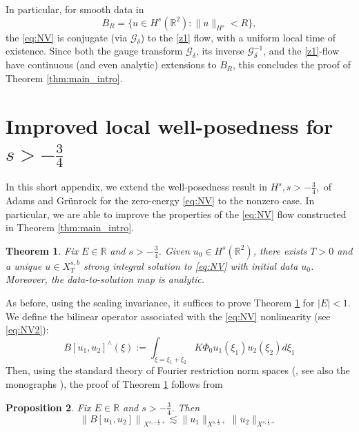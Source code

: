\documentclass[a4paper,
11pt,  reqno]{amsart}
\newcommand{\5}{\textup{V}}
\newcommand{\dl}{\delta}
\newtheorem{theorem}{Theorem} [section]
\newtheorem{proposition}[theorem]{Proposition}
\theoremstyle{remark}
\newcommand{\R}{\mathbb{R}}
\newcommand{\Gc}{\mathcal{G}}
\numberwithin{equation}{section}
\numberwithin{theorem}{section}
\begin{document}
In particular, for smooth data in
$$
B_R=\{u\in H^s(\R^2) : \|u\|_{H^s}< R \},
$$
the \eqref{eq:NV} is conjugate (via $\Gc_{\delta}$) to the \eqref{z1} flow, with a uniform local time of existence. Since both the gauge transform $\Gc_\delta$, its inverse $\Gc_{\dl}^{-1}$, and the \eqref{z1}-flow have continuous (and even analytic) extensions to $B_R$, this concludes the proof of Theorem \ref{thm:main_intro}.



\appendix

\section{Improved local well-posedness for $s>-\frac34$}

In this short appendix, we extend the well-posedness result in $H^s, s>-\frac34,$ of Adams and Grünrock for the zero-energy \eqref{eq:NV} to the nonzero case. In particular, we are able to improve the properties of the \eqref{eq:NV} flow constructed in Theorem \ref{thm:main_intro}. 


\begin{theorem}\label{thm:s-34}
Fix $E\in \R$ and $s>-\frac34$. Given $u_0\in H^s(\R^2)$, there exists $T>0$ and a unique $u\in X^{s,b}_T$ strong integral solution to \eqref{eq:NV} with initial data $u_0$. Moreover, the data-to-solution map is analytic.
\end{theorem}


As before, using the scaling invariance, it suffices to prove Theorem \ref{thm:s-34} for $|E|<1$. We define the bilinear operator associated with the \eqref{eq:NV} nonlinearity (see \eqref{eq:NV2}):
$$
B[u_1,u_2]^\wedge(\xi):=\int_{\xi=\xi_1+\xi_2} K\Phi_0u_1(\xi_1)u_2(\xi_2)d\xi_1
$$
Then, using the standard theory of Fourier restriction norm spaces (\cite{bourg1,bourg2}, see also the monographs \cite{linaresponce, tao_book}), the proof of Theorem \ref{thm:s-34} follows from 

\begin{proposition}
Fix $E\in \R$ and $s>-\frac34$. Then
\begin{equation}\label{eq:bilin_s-34}
\left\| B[u_1,u_2]\right\|_{X^{s,-\frac12+}}\lesssim \|u_1\|_{X^{s,\frac12+}}\|u_2\|_{X^{s,\frac12+}}
\end{equation}

\end{proposition}
\end{document}
